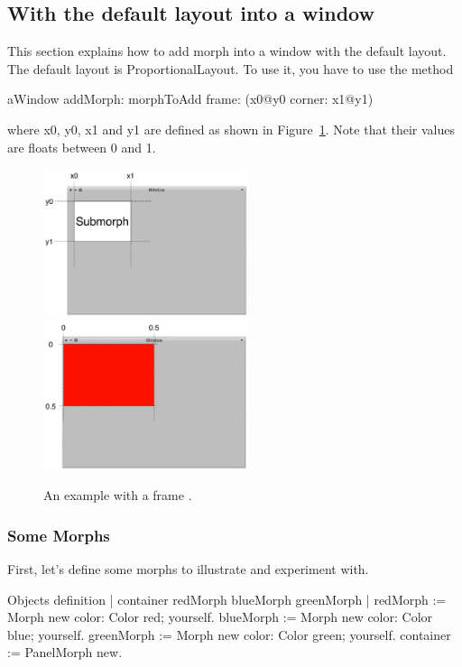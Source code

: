 \documentclass[a4paper,10pt,twoside]{book}
\begin{document}
\subsection{With the default layout into a window}

This section  explains how to add morph into a window with the default layout.
The default layout is ProportionalLayout. To use it, you have to use the method 
\begin{code}{}
aWindow
	addMorph: morphToAdd
	frame: (x0@y0 corner: x1@y1)
\end{code}
where x0, y0, x1 and y1 are defined as shown in  Figure~\ref{fig:frameExplanation}. Note that their values are floats between 0 and 1.

\begin{figure}[ht]\centering
	\includegraphics[width=6cm]{DefaultFrame}\includegraphics[width=6cm]{FrameExplanation}
	\caption{An example with a frame .}
	\label{fig:frameExplanation}
\end{figure}

\subsubsection{Some Morphs}
First, let's define some morphs to illustrate and experiment with.
\begin{code}{Objects definition}
| container redMorph blueMorph greenMorph |
redMorph := Morph new color: Color red; yourself.				
blueMorph := Morph new color: Color blue; yourself.
greenMorph := Morph new  color: Color green; yourself.
container := PanelMorph new.
\end{code}
\end{document}

